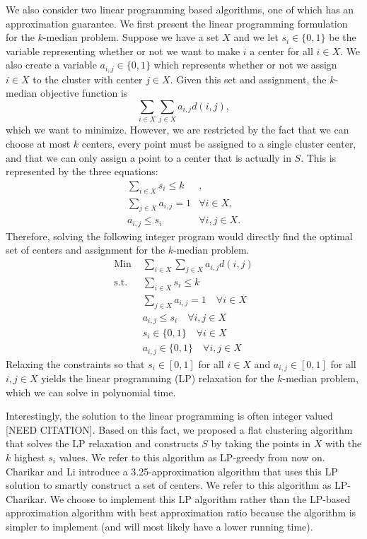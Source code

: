\documentclass[conference, 10pt, final]{IEEEtran}
\begin{document}
We also consider two linear programming based algorithms, one of which has an approximation guarantee. We first present the linear programming formulation for the $k$-median problem. Suppose we have a set $X$ and we let $s_i \in \{0,1\}$ be the variable representing whether or not we want to make $i$ a center for all $i \in X$. We also create a variable $a_{i,j} \in \{0, 1\}$ which represents whether or not we assign $i \in X$ to the cluster with center $j \in X$. Given this set and assignment, the $k$-median objective function is 
\begin{equation}
\sum_{i \in X} \sum_{j \in X} a_{i,j} d(i,j), 
\end{equation}
which we want to minimize. However, we are restricted by the fact that we can choose at most $k$ centers, every point must be assigned to a single cluster center, and that we can only assign a point to a center that is actually in $S$. This is represented by the three equations:
\begin{eqnarray}
\sum_{i \in X} s_i   \leq k & ,\\
\sum_{j \in X} a_{i,j}  = 1 & \forall i \in X, \\
a_{i,j}   \leq s_i & \forall i, j \in X.
\end{eqnarray}
Therefore, solving the following integer program would directly find the optimal set of centers and assignment for the $k$-median problem.
\begin{eqnarray}
\text{Min } & \sum_{i \in X} \sum_{j \in X} a_{i,j} d(i,j) \\
\text{s.t. } & \sum_{i \in X} s_i   \leq k  \\
& \sum_{j \in X} a_{i,j}  = 1 \quad \forall i \in X \\
& a_{i,j}   \leq s_i \quad \forall i, j \in X \\
& s_i \in \{0,1\} \quad \forall i \in X \\
& a_{i,j} \in \{0,1\} \quad \forall i, j \in X
\end{eqnarray}
Relaxing the constraints so that $s_i \in [0,1]$ for all $i \in X$ and $a_{i,j} \in [0,1]$ for all $i,j \in X$ yields the linear programming (LP) relaxation for the $k$-median problem, which we can solve in polynomial time.

Interestingly, the solution to the linear programming is often integer valued [NEED CITATION]. Based on this fact, we proposed a flat clustering algorithm that solves the LP relaxation and constructs $S$ by taking the points in $X$ with the $k$ highest $s_i$ values. We refer to this algorithm as LP-greedy from now on.
Charikar and Li \cite{charikar} introduce a 3.25-approximation algorithm that uses this LP solution to smartly construct a set of centers. We refer to this algorithm as LP-Charikar. We choose to implement this LP algorithm rather than the LP-based approximation algorithm with best approximation ratio because the algorithm is simpler to implement (and will most likely have a lower running time). 
\end{document}
